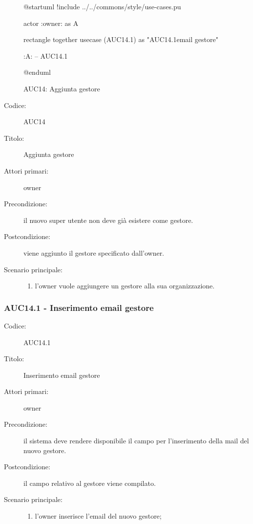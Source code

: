 \documentclass[../../../analisi-dei-requisiti.tex]{subfiles}
\begin{document}
\begin{figure}[H]
  \centering
  \begin{plantuml}
  @startuml
  !include ../../commons/style/use-cases.pu

  actor :owner: as A

  rectangle {
    together {
      usecase (AUC14.1) as "AUC14.1\nInserimento email gestore"
    }
  }

  :A: -- AUC14.1

  @enduml
  \end{plantuml}
  \caption{AUC14: Aggiunta gestore}
  \label{fig:auc14}
\end{figure}

\begin{description}
  \item[Codice:] AUC14
  \item[Titolo:] Aggiunta gestore
  \item[Attori primari:] owner
  \item[Precondizione:] il nuovo super utente non deve già esistere come gestore.
  \item[Postcondizione:] viene aggiunto il gestore specificato dall'owner.
  \item[Scenario principale:]
  \begin{enumerate}
    \item l'owner vuole aggiungere un gestore alla sua organizzazione.
  \end{enumerate}
\end{description}

\subsubsection{AUC14.1 - Inserimento email gestore}%
\label{subs:AUC14.1}
\begin{description}
  \item[Codice:] AUC14.1
  \item[Titolo:] Inserimento email gestore
  \item[Attori primari:] owner
  \item[Precondizione:] il sistema deve rendere disponibile il campo per l'inserimento della mail del nuovo gestore.
  \item[Postcondizione:] il campo relativo al gestore viene compilato.
  \item[Scenario principale:]
  \begin{enumerate}
    \item l'owner inserisce l'email del nuovo gestore;
  \end{enumerate}
\end{description}
\end{document}
